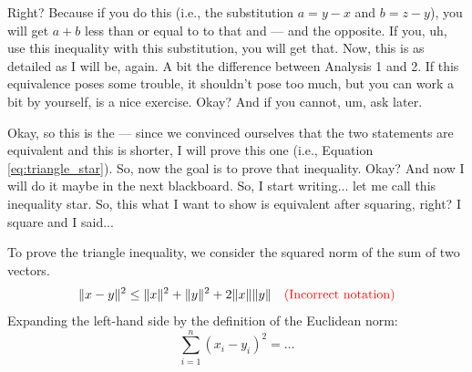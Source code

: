 

\begin{spoken-clean}[00:00:00 - 00:01:24]
Right? Because if you do this (i.e., the substitution $a = y - x$ and $b = z - y$), you will get $a + b$ less than or equal to to that and --- and the opposite. If you, uh, use this inequality with this substitution, you will get that. Now, this is as detailed as I will be, again. A bit the difference between Analysis 1 and 2. If this equivalence poses some trouble, it shouldn't pose too much, but you can work a bit by yourself, is a nice exercise. Okay? And if you cannot, um, ask later.

Okay, so this is the --- since we convinced ourselves that the two statements are equivalent and this is shorter, I will prove this one (i.e., Equation \ref{eq:triangle_star}). So, now the goal is to prove that inequality. Okay? And now I will do it maybe in the next blackboard.  So, I start writing... let me call this inequality star.  So, this what I want to show is equivalent after squaring, right? I square and I said...
\end{spoken-clean}

\begin{math-stroke}
\begin{ai-proof-skeleton-invisible-content}
\end{ai-proof-skeleton-invisible-content}
To prove the triangle inequality, we consider the squared norm of the sum of two vectors. 
\begin{equation} \label{eq:triangle_sq_wrong}
\|x - y\|^2 \le \|x\|^2 + \|y\|^2 + 2\|x\|\|y\| \quad \textcolor{red}{\text{(Incorrect notation)}}
\end{equation}
Expanding the left-hand side by the definition of the Euclidean norm:
\[
\sum_{i=1}^n (x_i - y_i)^2 = \dots
\]
\end{math-stroke}

